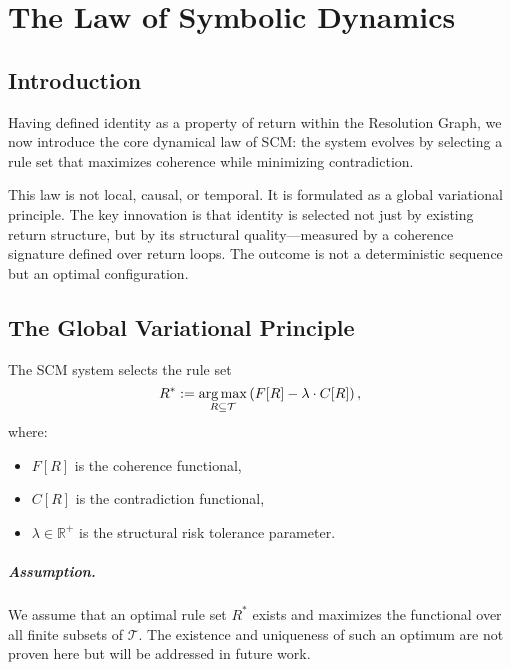 \chapter{The Law of Symbolic Dynamics}

\section*{Introduction}

Having defined identity as a property of return within the Resolution Graph, we now introduce the core dynamical law of SCM: the system evolves by selecting a rule set that maximizes coherence while minimizing contradiction.

This law is not local, causal, or temporal. It is formulated as a global variational principle. The key innovation is that identity is selected not just by existing return structure, but by its structural quality—measured by a coherence signature defined over return loops. The outcome is not a deterministic sequence but an optimal configuration.

\section{The Global Variational Principle}

\begin{axiom}
The SCM system selects the rule set
\begin{equation}
R^* := \operatorname*{arg\,max}_{R \subseteq \mathcal{T}} \left( F[R] - \lambda \cdot C[R] \right),
\end{equation}
where:
\begin{itemize}
    \item $F[R]$ is the coherence functional,
    \item $C[R]$ is the contradiction functional,
    \item $\lambda \in \mathbb{R}^+$ is the structural risk tolerance parameter.
\end{itemize}
\end{axiom}

\paragraph{Assumption.}
We assume that an optimal rule set $R^*$ exists and maximizes the functional over all finite subsets of $\mathcal{T}$. The existence and uniqueness of such an optimum are not proven here but will be addressed in future work.

